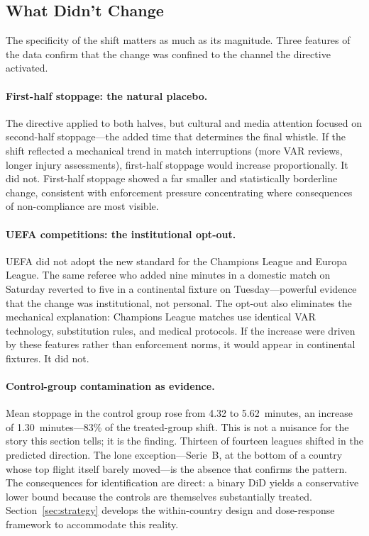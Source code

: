 \subsection{What Didn't Change}
\label{sec:first_stage:placebo}

The specificity of the shift matters as much as its magnitude. Three
features of the data confirm that the change was confined to the
channel the directive activated.

\paragraph{First-half stoppage: the natural placebo.}
The directive applied to both halves, but cultural and media attention
focused on second-half stoppage---the added time that determines the
final whistle. If the shift reflected a mechanical trend in match
interruptions (more VAR reviews, longer injury assessments), first-half
stoppage would increase proportionally. It did not. First-half stoppage
showed a far smaller and statistically borderline change, consistent
with enforcement pressure concentrating where consequences of
non-compliance are most visible.

\paragraph{UEFA competitions: the institutional opt-out.}
UEFA did not adopt the new standard for the Champions League and
Europa League. The same referee who added nine minutes in a domestic
match on Saturday reverted to five in a continental fixture on
Tuesday---powerful evidence that the change was institutional, not
personal. The opt-out also eliminates the mechanical explanation:
Champions League matches use identical VAR technology, substitution
rules, and medical protocols. If the increase were driven by these
features rather than enforcement norms, it would appear in continental
fixtures. It did not.

\paragraph{Control-group contamination as evidence.}
Mean stoppage in the control group rose from 4.32 to 5.62~minutes, an
increase of 1.30~minutes---83\% of the treated-group shift. This is
not a nuisance for the story this section tells; it is the finding.
Thirteen of fourteen leagues shifted in the predicted direction. The
lone exception---Serie~B, at the bottom of a country whose top flight
itself barely moved---is the absence that confirms the pattern. The
consequences for identification are direct: a binary DiD yields a
conservative lower bound because the controls are themselves
substantially treated. Section~\ref{sec:strategy} develops the
within-country design and dose-response framework to accommodate this
reality.

